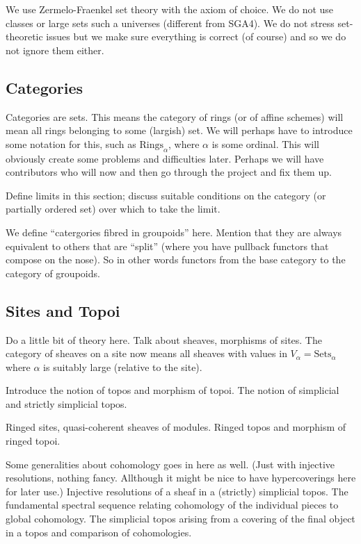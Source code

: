 \noindent 
We use Zermelo-Fraenkel set theory with the axiom of choice. We do not 
use classes or large sets such a universes (different from SGA4). We do
not stress set-theoretic issues but we make sure everything is correct 
(of course) and so we do not ignore them either.

\subsection{Categories}
\label{subsection-categories}

\noindent
Categories are sets. This means the category of rings (or of affine 
schemes) will mean all rings belonging to some (largish) set. We will 
perhaps have to introduce some notation for this, such as 
$\text{Rings}_\alpha$, where $\alpha$ is some ordinal. This will 
obviously create some problems and difficulties later. Perhaps we
will have contributors who will now and then go through the project and 
fix them up.

\smallskip\noindent
Define limits in this section; discuss suitable conditions on the
category (or partially ordered set) over which to take the limit.

\smallskip\noindent
We define ``catergories fibred in groupoids'' here. Mention that they are
always equivalent to others that are ``split'' (where you have pullback 
functors that compose on the nose). So in other words functors from the base
category to the category of groupoids.

\subsection{Sites and Topoi}
\label{subsection-sites}

\noindent
Do a little bit of theory here. Talk about sheaves, morphisms of sites.
The category of sheaves on a site now means all sheaves with values in
$V_\alpha = \text{Sets}_\alpha$ where $\alpha$ is suitably large (relative
to the site).

Introduce the notion of topos and morphism of topoi. The notion of 
simplicial and strictly simplicial topos.

\smallskip\noindent
Ringed sites, quasi-coherent sheaves of modules. Ringed topos and 
morphism of ringed topoi.

\smallskip\noindent
Some generalities about cohomology goes in here as well. (Just with
injective resolutions, nothing fancy. Allthough it might be nice to
have hypercoverings here for later use.) Injective resolutions of a
sheaf in a (strictly) simplicial topos.  The fundamental spectral 
sequence relating cohomology of the individual pieces to global
cohomology. The simplicial topos arising from a covering of the final
object in a topos and comparison of cohomologies.

